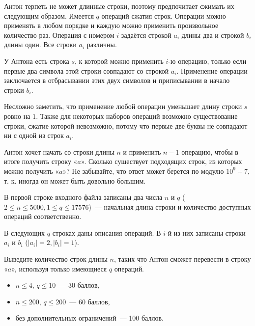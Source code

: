 
\Legend

Антон терпеть не может длинные строки, поэтому предпочитает сжимать их следующим образом. Имеется $q$ операций сжатия строк. Операции можно применять в любом порядке и каждую можно применить произвольное количество раз. Операция с номером $i$ задаётся строкой $a_i$ длины два и строкой $b_i$ длины один. Все строки $a_i$ различны.

У Антона есть строка $s$, к которой можно применить $i$-ю операцию, только если первые два символа этой строки совпадают со строкой $a_i$. Применение операции заключается в отбрасывании этих двух символов и приписывании в начало строки $b_i$.

Несложно заметить, что применение любой операции уменьшает длину строки $s$ ровно на $1$. Также для некоторых наборов операций возможно существование строки, сжатие которой невозможно, потому что первые две буквы не совпадают ни с одной из строк $a_i$.

Антон хочет начать со строки длины $n$ и применить $n - 1$ операцию, чтобы в итоге получить строку «$a$». Сколько существует подходящих строк, из которых можно получить «$a$»? Не забывайте, что ответ может берется по модулю $10^9 + 7$, т. к. иногда он может быть довольно большим.

\Input
В первой строке входного файла записаны два числа $n$ и $q$ ($2 \le n \le 5000, 1 \le q \le 17576$)~--- начальная длина строки и количество доступных операций соответственно.

В следующих $q$ строках даны описания операций. В $i$-й из них записаны строки $a_i$ и $b_i$ ($|a_i| = 2, |b_i| = 1$).

\Output
Выведите количество строк длины $n$, таких что Антон сможет перевести в строку «$a$», используя только имеющиеся $q$ операций.

\Samples
\BeginTests
\EndTests

\Scoring
\begin{itemize}
	\item $n \le 4$, $q \le 10$~--- 30 баллов,
	\item $n \le 200$, $q \le 200$~--- 60 баллов,
	\item без дополнительных ограничений~--- 100 баллов.
\end{itemize}

\EndProblem
